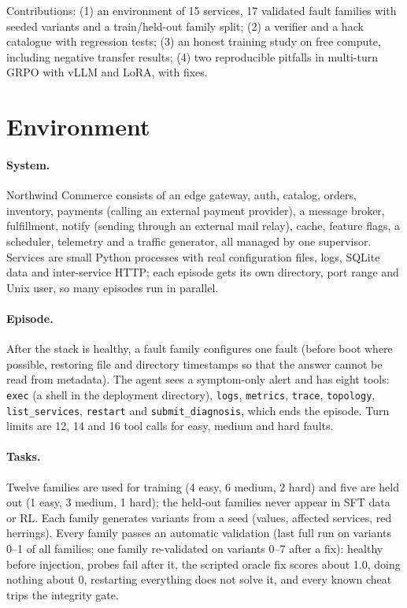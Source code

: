 \documentclass[11pt]{article}
\begin{document}
Contributions: (1) an environment of 15 services, 17 validated fault families with seeded variants and a train/held-out family split; (2) a verifier and a hack catalogue with regression tests; (3) an honest training study on free compute, including negative transfer results; (4) two reproducible pitfalls in multi-turn GRPO with vLLM and LoRA, with fixes.

\section{Environment}
\paragraph{System.} Northwind Commerce consists of an edge gateway, auth, catalog, orders, inventory, payments (calling an external payment provider), a message broker, fulfillment, notify (sending through an external mail relay), cache, feature flags, a scheduler, telemetry and a traffic generator, all managed by one supervisor. Services are small Python processes with real configuration files, logs, SQLite data and inter-service HTTP; each episode gets its own directory, port range and Unix user, so many episodes run in parallel.

\paragraph{Episode.} After the stack is healthy, a fault family configures one fault (before boot where possible, restoring file and directory timestamps so that the answer cannot be read from metadata). The agent sees a symptom-only alert and has eight tools: \texttt{exec} (a shell in the deployment directory), \texttt{logs}, \texttt{metrics}, \texttt{trace}, \texttt{topology}, \texttt{list\_services}, \texttt{restart} and \texttt{submit\_diagnosis}, which ends the episode. Turn limits are 12, 14 and 16 tool calls for easy, medium and hard faults.

\paragraph{Tasks.} Twelve families are used for training (4 easy, 6 medium, 2 hard) and five are held out (1 easy, 3 medium, 1 hard); the held-out families never appear in SFT data or RL. Each family generates variants from a seed (values, affected services, red herrings). Every family passes an automatic validation (last full run on variants 0--1 of all families; one family re-validated on variants 0--7 after a fix): healthy before injection, probes fail after it, the scripted oracle fix scores about 1.0, doing nothing about 0, restarting everything does not solve it, and every known cheat trips the integrity gate.
\end{document}
